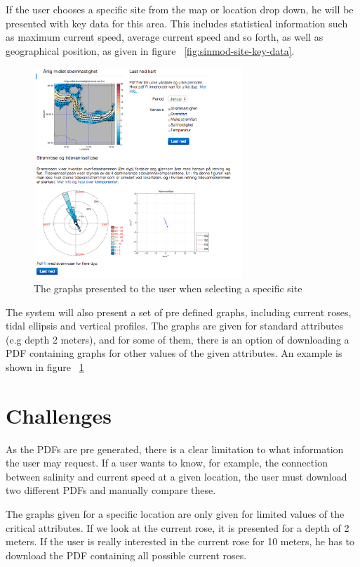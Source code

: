 \documentclass[11pt,a4paper,titlepage,oneside]{report}
\begin{document}
If the user chooses a specific site from the map or location drop down, he will be presented with key data for this area. This includes statistical information such as maximum current speed, average current speed and so forth, as well as geographical position, as given in figure ~\ref{fig:sinmod-site-key-data}.


\begin{figure}[h]
\begin{center}
\includegraphics[height=300px,width=300px]{img/site_graphs.png}
\caption{The graphs presented to the user when selecting a specific site}
\label{fig:sinmod-site-graphs}
\end{center}
\end{figure}

The system will also present a set of pre defined graphs, including current roses, tidal ellipsis and vertical profiles. The graphs are given for standard attributes (e.g depth 2 meters), and for some of them, there is an option of downloading a PDF containing graphs for other values of the given attributes. An example is shown in figure ~\ref{fig:sinmod-site-graphs}


\section{Challenges}
As the PDFs are pre generated, there is a clear limitation to what information the user may request. If a user wants to know, for example, the connection between salinity and current speed at a given location, the user must download two different PDFs and manually compare these. 

The graphs given for a specific location are only given for limited values of the critical attributes. If we look at the current rose, it is presented for a depth of 2 meters. If the user is really interested in the current rose for 10 meters, he has to download the PDF containing all possible current roses. 
\end{document}
